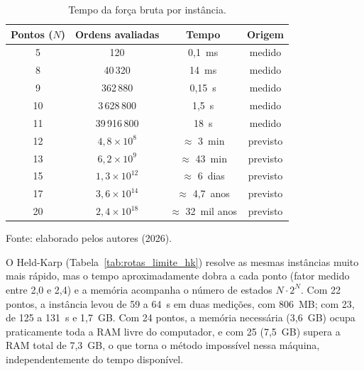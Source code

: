 \begin{table}[H]
    \centering
    \caption{Tempo da força bruta por instância.}
    \label{tab:rotas_limite_fb}
    \small
    \renewcommand{\arraystretch}{1.2}
    \begin{tabular}{cccc}
        \hline
        \textbf{Pontos ($N$)} & \textbf{Ordens avaliadas} & \textbf{Tempo} & \textbf{Origem} \\
        \hline
        5 & 120 & 0,1~ms & medido \\
        8 & 40\,320 & 14~ms & medido \\
        9 & 362\,880 & 0,15~s & medido \\
        10 & 3\,628\,800 & 1,5~s & medido \\
        11 & 39\,916\,800 & 18~s & medido \\
        12 & $4{,}8 \times 10^{8}$ & $\approx$ 3~min & previsto \\
        13 & $6{,}2 \times 10^{9}$ & $\approx$ 43~min & previsto \\
        15 & $1{,}3 \times 10^{12}$ & $\approx$ 6~dias & previsto \\
        17 & $3{,}6 \times 10^{14}$ & $\approx$ 4,7~anos & previsto \\
        20 & $2{,}4 \times 10^{18}$ & $\approx$ 32~mil anos & previsto \\
        \hline
    \end{tabular}
    \par\vspace{0.2cm}
    \footnotesize Fonte: elaborado pelos autores (2026).
\end{table}

O Held-Karp (Tabela~\ref{tab:rotas_limite_hk}) resolve as mesmas instâncias muito mais rápido, mas o tempo aproximadamente dobra a cada ponto (fator medido entre 2,0 e 2,4) e a memória acompanha o número de estados $N \cdot 2^N$. Com 22 pontos, a instância levou de 59 a 64~s em duas medições, com 806~MB; com 23, de 125 a 131~s e 1,7~GB. Com 24 pontos, a memória necessária (3,6~GB) ocupa praticamente toda a RAM livre do computador, e com 25 (7,5~GB) supera a RAM total de 7,3~GB, o que torna o método impossível nessa máquina, independentemente do tempo disponível.

